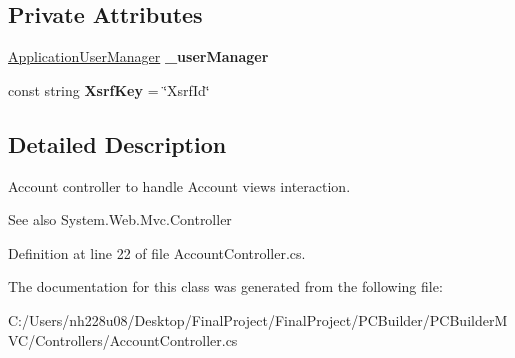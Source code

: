 \subsection*{Private Attributes}
\begin{DoxyCompactItemize}
\item 
\hyperlink{class_p_c_builder_m_v_c_1_1_application_user_manager}{Application\+User\+Manager} {\bfseries \+\_\+user\+Manager}\hypertarget{class_p_c_builder_m_v_c_1_1_controllers_1_1_account_controller_ac6da80aa091b402afa58aaad261523b8}{}\label{class_p_c_builder_m_v_c_1_1_controllers_1_1_account_controller_ac6da80aa091b402afa58aaad261523b8}

\item 
const string {\bfseries Xsrf\+Key} = \char`\"{}Xsrf\+Id\char`\"{}\hypertarget{class_p_c_builder_m_v_c_1_1_controllers_1_1_account_controller_a618e736b98df1dc62c90859c37b19312}{}\label{class_p_c_builder_m_v_c_1_1_controllers_1_1_account_controller_a618e736b98df1dc62c90859c37b19312}

\end{DoxyCompactItemize}


\subsection{Detailed Description}
Account controller to handle Account views interaction. 

\begin{DoxySeeAlso}{See also}
System.\+Web.\+Mvc.\+Controller


\end{DoxySeeAlso}


Definition at line 22 of file Account\+Controller.\+cs.



The documentation for this class was generated from the following file\+:\begin{DoxyCompactItemize}
\item 
C\+:/\+Users/nh228u08/\+Desktop/\+Final\+Project/\+Final\+Project/\+P\+C\+Builder/\+P\+C\+Builder\+M\+V\+C/\+Controllers/Account\+Controller.\+cs\end{DoxyCompactItemize}
